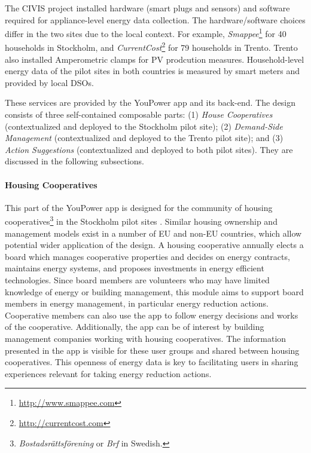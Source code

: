  The CIVIS project installed hardware (smart plugs and sensors) and
software required for appliance-level energy data collection. The hardware/software choices differ in the
two sites due to the local context. For example, \textit{Smappee}\footnote{\url{http://www.smappee.com}}
for 40 households in Stockholm, and \textit{CurrentCost}\footnote{\url{http://currentcost.com}} for 79
households in Trento. Trento also installed Amperometric clamps for PV prodcution measures. 
Household-level energy data of the pilot sites in both countries is measured by smart meters and provided by local DSOs. 

 These services are provided by the YouPower
app and its back-end. The design consists of three self-contained
composable parts: (1) \textit{House Cooperatives} (contextualized and deployed to the Stockholm pilot site);
(2) \textit{Demand-Side Management} (contextualized and deployed
to the Trento pilot site); and (3) \textit{Action Suggestions} (contextualized and deployed to both pilot sites).
They are discussed in the following subsections. 

\paragraph{Housing Cooperatives}
\label{sect:brf}

This part of the YouPower app is designed for the community of housing cooperatives\footnote{\textit{Bostadsr{\"a}ttsf{\"o}rening} or \textit{Brf} in Swedish.} in the Stockholm pilot sites \cite{Hasselqvist2016}.
Similar housing ownership and management models exist in a number of EU and non-EU countries, which allow potential wider application of the design.
A housing cooperative annually elects a board which manages cooperative properties and decides on energy contracts, maintains energy systems, and proposes investments in energy efficient technologies. Since board members are volunteers who may have limited knowledge of energy or building management, this module aims to support board members in energy management, in particular energy reduction actions. Cooperative members can also use the app to follow energy decisions and works of the cooperative. Additionally, the app can be of interest by building management companies working with housing cooperatives. 
The information presented in the app is visible for these user
groups and shared between housing cooperatives. This openness of energy data is key to
facilitating  users in sharing experiences relevant for taking energy reduction actions.

